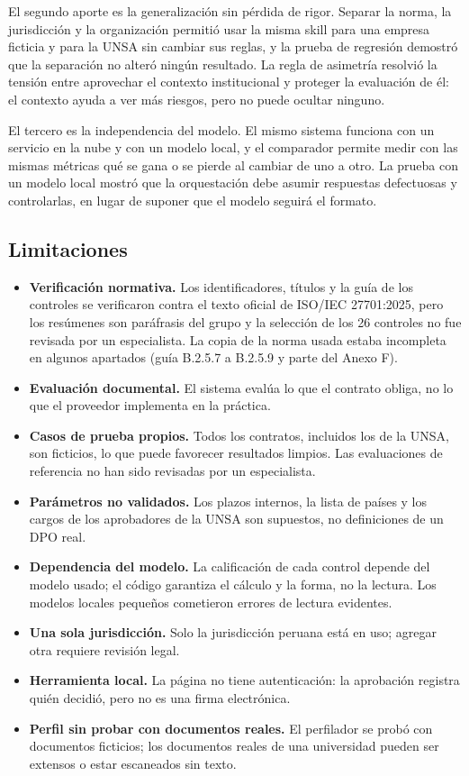 \documentclass[12pt,letterpaper]{article}
\begin{document}
El segundo aporte es la generalización sin pérdida de rigor. Separar la norma, la jurisdicción y la organización permitió usar la misma skill para una empresa ficticia y para la UNSA sin cambiar sus reglas, y la prueba de regresión demostró que la separación no alteró ningún resultado. La regla de asimetría resolvió la tensión entre aprovechar el contexto institucional y proteger la evaluación de él: el contexto ayuda a ver más riesgos, pero no puede ocultar ninguno.

El tercero es la independencia del modelo. El mismo sistema funciona con un servicio en la nube y con un modelo local, y el comparador permite medir con las mismas métricas qué se gana o se pierde al cambiar de uno a otro. La prueba con un modelo local mostró que la orquestación debe asumir respuestas defectuosas y controlarlas, en lugar de suponer que el modelo seguirá el formato.

\subsection{Limitaciones}

\begin{itemize}
  \item \textbf{Verificación normativa.} Los identificadores, títulos y la guía de los controles se verificaron contra el texto oficial de ISO/IEC 27701:2025, pero los resúmenes son paráfrasis del grupo y la selección de los 26 controles no fue revisada por un especialista. La copia de la norma usada estaba incompleta en algunos apartados (guía B.2.5.7 a B.2.5.9 y parte del Anexo F).
  \item \textbf{Evaluación documental.} El sistema evalúa lo que el contrato obliga, no lo que el proveedor implementa en la práctica.
  \item \textbf{Casos de prueba propios.} Todos los contratos, incluidos los de la UNSA, son ficticios, lo que puede favorecer resultados limpios. Las evaluaciones de referencia no han sido revisadas por un especialista.
  \item \textbf{Parámetros no validados.} Los plazos internos, la lista de países y los cargos de los aprobadores de la UNSA son supuestos, no definiciones de un DPO real.
  \item \textbf{Dependencia del modelo.} La calificación de cada control depende del modelo usado; el código garantiza el cálculo y la forma, no la lectura. Los modelos locales pequeños cometieron errores de lectura evidentes.
  \item \textbf{Una sola jurisdicción.} Solo la jurisdicción peruana está en uso; agregar otra requiere revisión legal.
  \item \textbf{Herramienta local.} La página no tiene autenticación: la aprobación registra quién decidió, pero no es una firma electrónica.
  \item \textbf{Perfil sin probar con documentos reales.} El perfilador se probó con documentos ficticios; los documentos reales de una universidad pueden ser extensos o estar escaneados sin texto.
\end{itemize}
\end{document}
